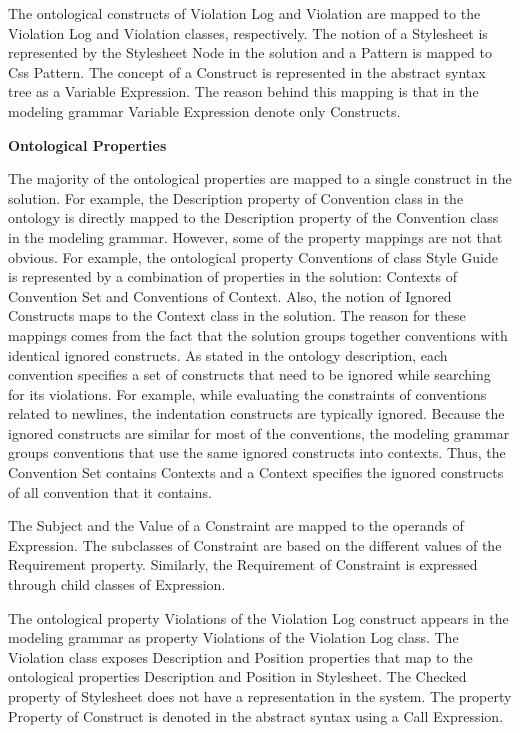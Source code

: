 The ontological constructs of Violation Log and Violation are mapped to the
Violation Log and Violation classes, respectively. The notion of a Stylesheet
is represented by the Stylesheet Node in the solution and a Pattern is mapped
to Css Pattern. The concept of a Construct is represented in the abstract
syntax tree as a Variable Expression. The reason behind this mapping is that
in the modeling grammar Variable Expression denote only Constructs.

\textbf{Ontological Properties}

The majority of the ontological properties are mapped to a single construct in
the solution. For example, the Description property of Convention class in the
ontology is directly mapped to the Description property of the Convention
class in the modeling grammar. However, some of the property mappings are not
that obvious. For example, the ontological property Conventions of class Style
Guide is represented by a combination of properties in the solution: Contexts
of Convention Set and Conventions of Context. Also, the notion of Ignored
Constructs maps to the Context class in the solution. The reason for these
mappings comes from the fact that the solution groups together conventions
with identical ignored constructs. As stated in the ontology description, each
convention specifies a set of constructs that need to be ignored while
searching for its violations. For example, while evaluating the constraints of
conventions related to newlines, the indentation constructs are typically
ignored. Because the ignored constructs are similar for most of the
conventions, the modeling grammar groups conventions that use the same ignored
constructs into contexts. Thus, the Convention Set contains Contexts and a
Context specifies the ignored constructs of all convention that it contains.

The Subject and the Value of a Constraint are mapped to the operands of
Expression. The subclasses of Constraint are based on the different values of
the Requirement property. Similarly, the Requirement of Constraint is
expressed through child classes of Expression.

The ontological property Violations of the Violation Log construct appears in
the modeling grammar as property Violations of the Violation Log class. The
Violation class exposes Description and Position properties that map to the
ontological properties Description and Position in Stylesheet. The Checked
property of Stylesheet does not have a representation in the system. The
property Property of Construct is denoted in the abstract syntax using a Call
Expression.

